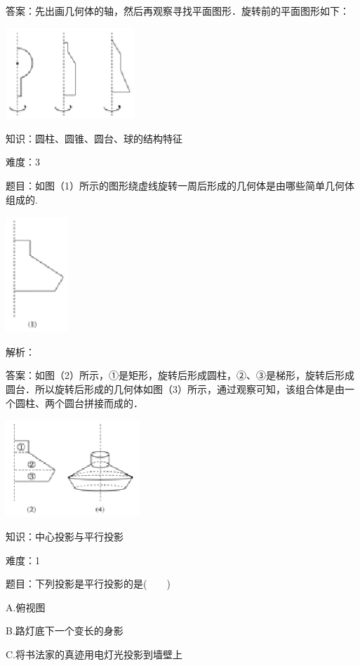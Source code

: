 \documentclass{article} %
\begin{document}
答案：先出画几何体的轴，然后再观察寻找平面图形．旋转前的平面图形如下：

\includegraphics*[width=1.92in, height=1.35in, keepaspectratio=false]{image25}

知识：圆柱、圆锥、圆台、球的结构特征

难度：3

题目：如图（1）所示的图形绕虚线旋转一周后形成的几何体是由哪些简单几何体组成的.

\includegraphics*[width=0.93in, height=1.72in, keepaspectratio=false]{image26}

解析：

答案：如图（2）所示，①是矩形，旋转后形成圆柱，②、③是梯形，旋转后形成圆台．所以旋转后形成的几何体如图（3）所示，通过观察可知，该组合体是由一个圆柱、两个圆台拼接而成的．

\includegraphics*[width=1.98in, height=1.44in, keepaspectratio=false]{image27}



知识：中心投影与平行投影

难度：1

题目：下列投影是平行投影的是(　　)

A.俯视图

B.路灯底下一个变长的身影

C.将书法家的真迹用电灯光投影到墙壁上
\end{document}
